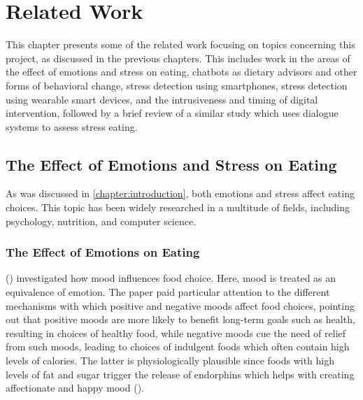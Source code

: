 
\chapter{Related Work}\label{chapter:related_work}
This chapter presents some of the related work focusing on topics concerning this project, as discussed in the previous chapters. This includes work in the areas of the effect of emotions and stress on eating, chatbots as dietary advisors and other forms of behavioral change, stress detection using smartphones, stress detection using wearable smart devices, and the intrusiveness and timing of digital intervention, followed by a brief review of a similar study which uses dialogue systems to assess stress eating.

\section{The Effect of Emotions and Stress on Eating}
As was discussed in \autoref{chapter:introduction}, both emotions and stress affect eating choices. This topic has been widely researched in a multitude of fields, including psychology, nutrition, and computer science.

\subsection{The Effect of Emotions on Eating}
\citeauthor{4_mood_eat} (\citeyear{4_mood_eat}) investigated how mood influences food choice. Here, mood is treated as an equivalence of emotion. The paper paid particular attention to the different mechanisms with which positive and negative moods affect food choices, pointing out that positive moods are more likely to benefit long-term goals such as health, resulting in choices of healthy food, while negative moods cue the need of relief from such moods, leading to choices of indulgent foods which often contain high levels of calories. The latter is physiologically plausible since foods with high levels of fat and sugar trigger the release of endorphins which helps with creating affectionate and happy mood (\cite{32_endorphins}).\bigskip

